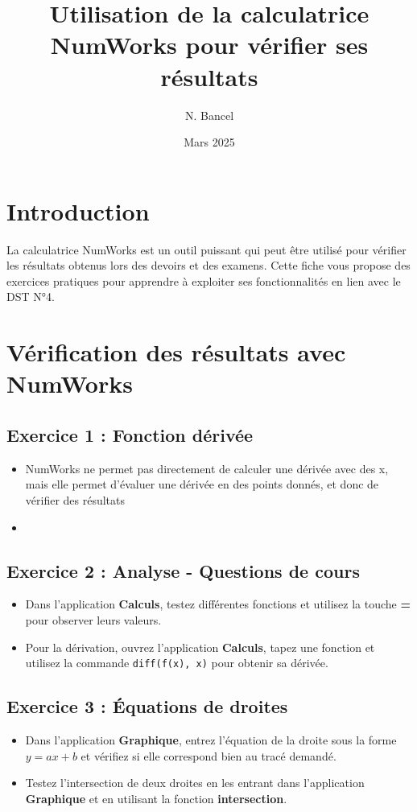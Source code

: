 \documentclass{article}
\title{Utilisation de la calculatrice NumWorks pour vérifier ses résultats}
\author{N. Bancel}
\date{Mars 2025}
\begin{document}
\maketitle

\section{Introduction}
La calculatrice NumWorks est un outil puissant qui peut être utilisé pour vérifier les résultats obtenus lors des devoirs et des examens. Cette fiche vous propose des exercices pratiques pour apprendre à exploiter ses fonctionnalités en lien avec le DST N°4.

\section{Vérification des résultats avec NumWorks}

\subsection{Exercice 1 : Fonction dérivée}
\begin{itemize}
\item NumWorks ne permet pas directement de calculer une dérivée avec des x, mais elle permet d'évaluer une dérivée en des points donnés, et donc de vérifier des résultats
\item 
\end{itemize}

\subsection{Exercice 2 : Analyse - Questions de cours}
\begin{itemize}
\item Dans l'application \textbf{Calculs}, testez différentes fonctions et utilisez la touche \textbf{=} pour observer leurs valeurs.
\item Pour la dérivation, ouvrez l'application \textbf{Calculs}, tapez une fonction et utilisez la commande \texttt{diff(f(x), x)} pour obtenir sa dérivée.
\end{itemize}

\subsection{Exercice 3 : Équations de droites}
\begin{itemize}
\item Dans l'application \textbf{Graphique}, entrez l'équation de la droite sous la forme $y = ax + b$ et vérifiez si elle correspond bien au tracé demandé.
\item Testez l'intersection de deux droites en les entrant dans l'application \textbf{Graphique} et en utilisant la fonction \textbf{intersection}.
\end{itemize}
\end{document}
